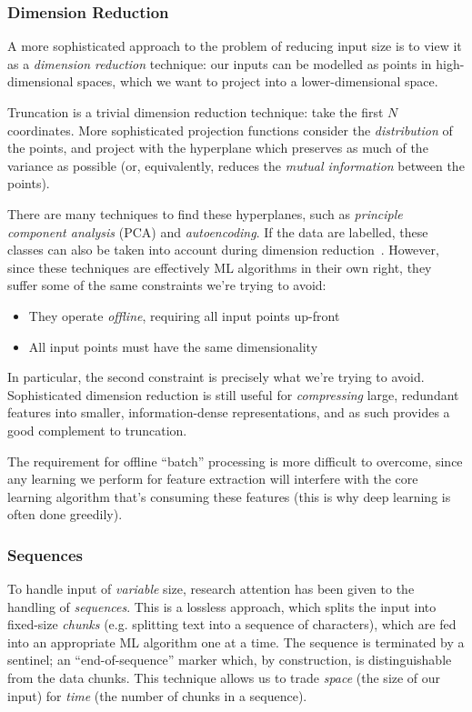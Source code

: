 \subsubsection{Dimension Reduction}

A more sophisticated approach to the problem of reducing input size is to view
it as a \emph{dimension reduction} technique: our inputs can be modelled as
points in high-dimensional spaces, which we want to project into a
lower-dimensional space.

Truncation is a trivial dimension reduction technique: take the first $N$
coordinates. More sophisticated projection functions consider the
\emph{distribution} of the points, and project with the hyperplane which
preserves as much of the variance as possible (or, equivalently, reduces the
\emph{mutual information} between the points).

There are many techniques to find these hyperplanes, such as \emph{principle
  component analysis} (PCA) and \emph{autoencoding}. If the data are labelled,
these classes can also be taken into account during dimension
reduction~\cite{Oveisi.Oveisi.Erfanian.ea:2012}. However, since these
techniques are effectively ML algorithms in their own right, they suffer some of
the same constraints we're trying to avoid:

\begin{itemize}
  \item They operate \emph{offline}, requiring all input points up-front
  \item All input points must have the same dimensionality
\end{itemize}

In particular, the second constraint is precisely what we're trying to
avoid. Sophisticated dimension reduction is still useful for \emph{compressing}
large, redundant features into smaller, information-dense representations, and
as such provides a good complement to truncation.

The requirement for offline ``batch'' processing is more difficult to overcome,
since any learning we perform for feature extraction will interfere with the
core learning algorithm that's consuming these features (this is why deep
learning is often done greedily).

\subsubsection{Sequences}

To handle input of \emph{variable} size, research attention has been given to
the handling of \emph{sequences}. This is a lossless approach, which splits the
input into fixed-size \emph{chunks} (e.g. splitting text into a sequence of
characters), which are fed into an appropriate ML algorithm one at a time. The
sequence is terminated by a sentinel; an ``end-of-sequence'' marker which, by
construction, is distinguishable from the data chunks. This technique allows us
to trade \emph{space} (the size of our input) for \emph{time} (the number of
chunks in a sequence).

